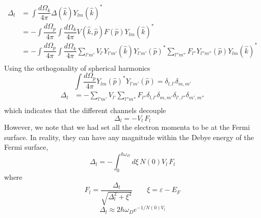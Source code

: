 \documentclass[aps,prb,onecolumn,notitlepage,showpacs,floatfix,superscriptaddress]{revtex4-1}
\begin{document}
\begin{equation}
\begin{split}
\Delta_{l} &= \int \dfrac{d\Omega_k}{4\pi} \Delta(\hat{k})  Y_{lm}(\hat{k})^* \\
 &= -\int \dfrac{d\Omega_p}{4\pi} \int \dfrac{d\Omega_k}{4\pi} V(\hat{k},\hat{p}) F({\hat{ p}}) Y_{lm}(\hat{k})^* \\
  &= -\int \dfrac{d\Omega_p}{4\pi} \int \dfrac{d\Omega_k}{4\pi} \sum_{l'm'} V_{l'} Y_{l'm'}(\hat{k}) Y_{l'm'}(\hat{p})^* \sum_{l''m''} F_{l''} Y_{l''m''}(\hat{p})  Y_{lm}(\hat{k})^* \\
\end{split}
\end{equation}
Using the orthogonality of spherical harmonics
\begin{equation}
\int \dfrac{d\Omega_p}{4\pi} Y_{lm}(\hat{p})^* Y_{l'm'}(\hat{p}) = \delta_{l,l'} \delta_{m,m'}
\end{equation}
\begin{equation}
\begin{split}
\Delta_{l} &= - \sum_{l'm'} V_{l'}  \sum_{l''m''} F_{l''} \delta_{l,l'} \delta_{m,m'}\delta_{l',l''} \delta_{m',m''}\\
\end{split}
\end{equation}
which indicates that the different channels decouple
\begin{equation}
\Delta_{l} = - V_{l} \,  F_{l}
\end{equation}
However, we note that we had set all the electron momenta to be at the Fermi surface. In reality, they can have any magnitude within the Debye energy of the Fermi surface,
\begin{equation}
\Delta_{l} = - \int_0^{\hbar \omega_D} d\xi \, N(0) V_{l} \,  F_{l}
\end{equation}
where
\begin{equation}
F_l = \dfrac{\Delta_l}{\sqrt{\Delta_l^2 + \xi^2}} \qquad \xi=\varepsilon-E_F
\end{equation}
\begin{equation}
\Delta_l \approx 2 \hbar \omega_D e^{-1/N(0)V_l}
\end{equation}
\end{document}
